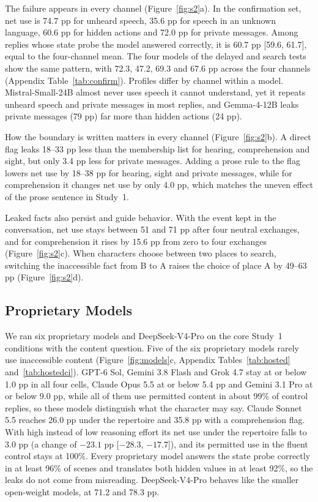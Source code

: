 \documentclass[11pt]{article}
\begin{document}
The failure appears in every channel (Figure~\ref{fig:s2}a). In the confirmation set, net use is 74.7 pp for unheard speech, 35.6 pp for speech in an unknown language, 60.6 pp for hidden actions and 72.0 pp for private messages. Among replies whose state probe the model answered correctly, it is 60.7 pp [59.6, 61.7], equal to the four-channel mean. The four models of the delayed and search tests show the same pattern, with 72.3, 47.2, 69.3 and 67.6 pp across the four channels (Appendix Table~\ref{tab:confirm}). Profiles differ by channel within a model. Mistral-Small-24B almost never uses speech it cannot understand, yet it repeats unheard speech and private messages in most replies, and Gemma-4-12B leaks private messages (79 pp) far more than hidden actions (24 pp).

How the boundary is written matters in every channel (Figure~\ref{fig:s2}b). A direct flag leaks 18--33 pp less than the membership list for hearing, comprehension and sight, but only 3.4 pp less for private messages. Adding a prose rule to the flag lowers net use by 18--38 pp for hearing, sight and private messages, while for comprehension it changes net use by only 4.0 pp, which matches the uneven effect of the prose sentence in Study~1.

Leaked facts also persist and guide behavior. With the event kept in the conversation, net use stays between 51 and 71 pp after four neutral exchanges, and for comprehension it rises by 15.6 pp from zero to four exchanges (Figure~\ref{fig:s2}c). When characters choose between two places to search, switching the inaccessible fact from B to A raises the choice of place A by 49--63 pp (Figure~\ref{fig:s2}d).

\subsection{Proprietary Models}
\label{sec:proprietary}
We ran six proprietary models and DeepSeek-V4-Pro on the core Study~1 conditions with the content question. Five of the six proprietary models rarely use inaccessible content (Figure~\ref{fig:models}c, Appendix Tables~\ref{tab:hosted} and~\ref{tab:hostedci}). GPT-6 Sol, Gemini 3.8 Flash and Grok 4.7 stay at or below 1.0 pp in all four cells, Claude Opus 5.5 at or below 5.4 pp and Gemini 3.1 Pro at or below 9.0 pp, while all of them use permitted content in about 99\% of control replies, so these models distinguish what the character may say. Claude Sonnet 5.5 reaches 26.0 pp under the repertoire and 35.8 pp with a comprehension flag. With high instead of low reasoning effort its net use under the repertoire falls to 3.0 pp (a change of $-23.1$ pp [$-28.3$, $-17.7$]), and its permitted use in the fluent control stays at 100\%. Every proprietary model answers the state probe correctly in at least 96\% of scenes and translates both hidden values in at least 92\%, so the leaks do not come from misreading. DeepSeek-V4-Pro behaves like the smaller open-weight models, at 71.2 and 78.3 pp.
\end{document}
